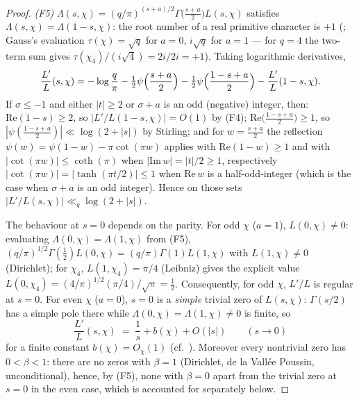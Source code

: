 \documentclass[11pt]{article}
\begin{document}
\begin{proof}
\emph{(F5)} $\Lambda(s,\chi)=(q/\pi)^{(s+a)/2}
\Gamma\bigl(\tfrac{s+a}2\bigr)L(s,\chi)$
satisfies $\Lambda(s,\chi)=\Lambda(1-s,\chi)$: the root number of a
real primitive character is $+1$ (\cite[Chs.~2, 9]{Dav00}; Gauss's
evaluation $\tau(\chi)=\sqrt q$ for $a=0$, $i\sqrt q$ for $a=1$ ---
for $q=4$ the two-term sum gives $\tau(\chi_4)/(i\sqrt4)=2i/2i=+1$).
Taking logarithmic derivatives,
\[
\frac{L'}{L}(s,\chi)
=-\log\frac q\pi-\tfrac12\psi\Bigl(\frac{s+a}2\Bigr)
-\tfrac12\psi\Bigl(\frac{1-s+a}2\Bigr)-\frac{L'}{L}(1-s,\chi).
\]
If $\sigma\le-1$ and either $|t|\ge2$ or $\sigma+a$ is an odd
(negative) integer, then: $\mathrm{Re}(1-s)\ge2$, so
$|L'/L(1-s,\chi)|=O(1)$ by
(F4); $\mathrm{Re}\bigl(\frac{1-s+a}2\bigr)\ge1$, so
$|\psi(\frac{1-s+a}2)|\ll\log(2+|s|)$ by Stirling; and for
$w=\frac{s+a}2$ the reflection $\psi(w)=\psi(1-w)-\pi\cot(\pi w)$
applies with $\mathrm{Re}(1-w)\ge1$ and with $|\cot(\pi w)|\le
\coth(\pi)$ when $|\mathrm{Im}\,w|=|t|/2\ge1$, respectively
$|\cot(\pi w)|=|\tanh(\pi t/2)|\le1$ when $\mathrm{Re}\,w$ is a
half-odd-integer (which is the case when $\sigma+a$ is an odd
integer). Hence on those sets
$|L'/L(s,\chi)|\ll_q\log(2+|s|)$.

The behaviour at $s=0$ depends on the parity. For odd $\chi$ ($a=1$),
$L(0,\chi)\ne0$: evaluating $\Lambda(0,\chi)=\Lambda(1,\chi)$
from (F5),
$(q/\pi)^{1/2}\Gamma(\tfrac12)L(0,\chi)=(q/\pi)\Gamma(1)L(1,\chi)$
with $L(1,\chi)\ne0$ (Dirichlet); for $\chi_4$, $L(1,\chi_4)=\pi/4$
(Leibniz) gives the explicit value
$L(0,\chi_4)=(4/\pi)^{1/2}(\pi/4)/\sqrt{\pi}=\tfrac12$.
Consequently, for odd $\chi$, $L'/L$ is regular at $s=0$. For even
$\chi$ ($a=0$), $s=0$ is a \emph{simple} trivial zero of $L(s,\chi)$:
$\Gamma(s/2)$ has a simple pole there while
$\Lambda(0,\chi)=\Lambda(1,\chi)\ne0$ is finite, so
\[
\frac{L'}{L}(s,\chi)\;=\;\frac1s+b(\chi)+O(|s|)\qquad(s\to0)
\]
for a finite constant $b(\chi)=O_\chi(1)$ (cf.\ \cite[Ch.~19]{Dav00}).
Moreover every nontrivial zero
has $0<\beta<1$: there are no zeros with $\beta=1$ (Dirichlet, de la
Vall\'ee Poussin, unconditional), hence, by (F5), none with $\beta=0$
apart from the trivial zero at $s=0$ in the even case, which is
accounted for separately below.


\end{proof}
\end{document}
